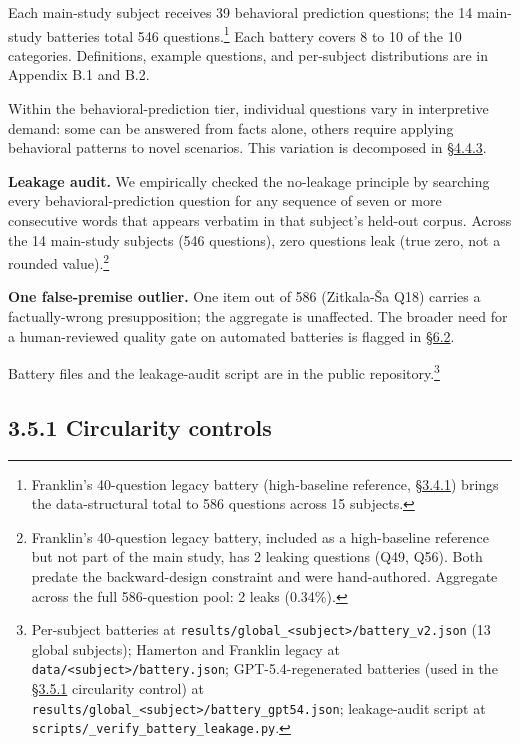 Each main-study subject receives 39 behavioral prediction questions; the
14 main-study batteries total 546 questions.\footnote{Franklin's
  40-question legacy battery (high-baseline reference, \hyperref[pretraining-coverage-variance-high-vs-low-baseline]{§3.4.1}) brings
  the data-structural total to 586 questions across 15 subjects.} Each
battery covers 8 to 10 of the 10 categories. Definitions, example
questions, and per-subject distributions are in Appendix B.1 and B.2.

Within the behavioral-prediction tier, individual questions vary in
interpretive demand: some can be answered from facts alone, others
require applying behavioral patterns to novel scenarios. This variation
is decomposed in \hyperref[where-the-spec-helps-where-it-hurts-and-which-question-types-route-to-each]{§4.4.3}.

\textbf{Leakage audit.} We empirically checked the no-leakage principle
by searching every behavioral-prediction question for any sequence of
seven or more consecutive words that appears verbatim in that subject's
held-out corpus. Across the 14 main-study subjects (546 questions), zero
questions leak (true zero, not a rounded value).\footnote{Franklin's
  40-question legacy battery, included as a high-baseline reference but
  not part of the main study, has 2 leaking questions (Q49, Q56). Both
  predate the backward-design constraint and were hand-authored.
  Aggregate across the full 586-question pool: 2 leaks (0.34\%).}

\textbf{One false-premise outlier.} One item out of 586 (Zitkala-Ša Q18)
carries a factually-wrong presupposition; the aggregate is unaffected.
The broader need for a human-reviewed quality gate on automated
batteries is flagged in \hyperref[measurement-apparatus]{§6.2}.

Battery files and the leakage-audit script are in the public
repository.\footnote{Per-subject batteries at
  \texttt{results/global\_\textless{}subject\textgreater{}/battery\_v2.json}
  (13 global subjects); Hamerton and Franklin legacy at
  \texttt{data/\textless{}subject\textgreater{}/battery.json};
  GPT-5.4-regenerated batteries (used in the \hyperref[circularity-controls]{§3.5.1} circularity control)
  at
  \texttt{results/global\_\textless{}subject\textgreater{}/battery\_gpt54.json};
  leakage-audit script at
  \texttt{scripts/\_verify\_battery\_leakage.py}.}

\hypertarget{circularity-controls}{%
\subsection{3.5.1 Circularity controls}\label{circularity-controls}}

